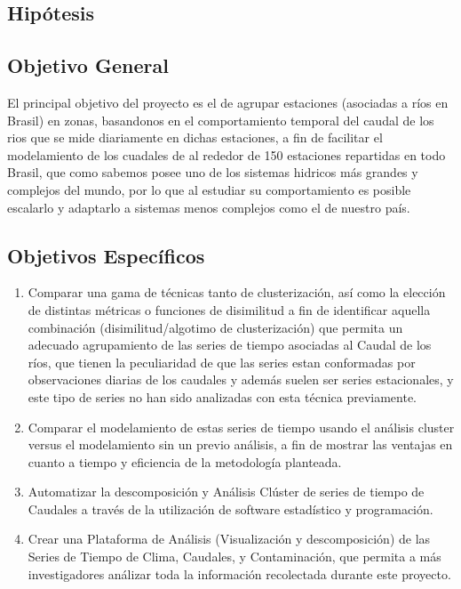 \documentclass[10pt,a4paper]{article}
\begin{document}
\subsection{Hipótesis}


\subsection{Objetivo General}
El principal objetivo del proyecto es el de agrupar estaciones (asociadas a ríos en Brasil) en zonas, basandonos en el comportamiento temporal del caudal de los rios que se mide diariamente en dichas estaciones, a fin de facilitar el modelamiento de los cuadales de al rededor de 150 estaciones repartidas en todo Brasil, que como sabemos posee uno de los sistemas hidricos más grandes y complejos del mundo, por lo que al estudiar su comportamiento es posible escalarlo y adaptarlo a sistemas menos complejos como el de nuestro país.

\subsection{Objetivos Específicos}
\begin{enumerate}

\item Comparar una gama de técnicas tanto de clusterización, así como la elección de distintas métricas o funciones de disimilitud a fin de identificar aquella combinación (disimilitud/algotimo de clusterización) que permita un adecuado agrupamiento de las series de tiempo asociadas al Caudal de los ríos, que tienen la peculiaridad de que las series estan conformadas por observaciones diarias de los caudales y además suelen ser series estacionales, y este tipo de series no han sido analizadas con esta técnica previamente.

\item Comparar el modelamiento de estas series de tiempo usando el análisis cluster versus el modelamiento sin un previo análisis, a fin de mostrar las ventajas en cuanto a tiempo y eficiencia de la metodología planteada.

\item Automatizar la descomposición y Análisis Clúster de series de tiempo de Caudales a través de la utilización de software estadístico y programación.

\item Crear una Plataforma de Análisis (Visualización y descomposición) de las Series de Tiempo de Clima, Caudales, y Contaminación, que permita a más investigadores análizar toda la información recolectada durante este proyecto.

\end{enumerate}
\end{document}
